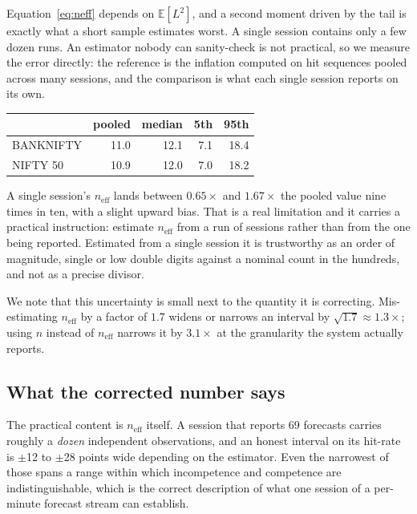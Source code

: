 \documentclass[conference]{IEEEtran}
\begin{document}
Equation~\eqref{eq:neff} depends on $\mathbb{E}[L^2]$, and a second moment
driven by the tail is exactly what a short sample estimates worst. A single
session contains only a few dozen runs. An estimator nobody can sanity-check is
not practical, so we measure the error directly: the reference is the inflation
computed on hit sequences pooled across many sessions, and the comparison is
what each single session reports on its own.

\begin{center}
\footnotesize
\begin{tabular}{@{}lrrrr@{}}
\toprule
& \textbf{pooled} & \textbf{median} & \textbf{5th} & \textbf{95th} \\
\midrule
BANKNIFTY & 11.0 & 12.1 & 7.1 & 18.4 \\
NIFTY 50 & 10.9 & 12.0 & 7.0 & 18.2 \\
\bottomrule
\end{tabular}
\end{center}

A single session's $n_{\text{eff}}$ lands between $0.65\times$ and $1.67\times$
the pooled value nine times in ten, with a slight upward bias. That is a real
limitation and it carries a practical instruction: estimate $n_{\text{eff}}$
from a run of sessions rather than from the one being reported. Estimated from a
single session it is trustworthy as an order of magnitude, single or low double
digits against a nominal count in the hundreds, and not as a precise divisor.

We note that this uncertainty is small next to the quantity it is correcting.
Mis-estimating $n_{\text{eff}}$ by a factor of $1.7$ widens or narrows an
interval by $\sqrt{1.7} \approx 1.3\times$; using $n$ instead of
$n_{\text{eff}}$ narrows it by $3.1\times$ at the granularity the system
actually reports.

\subsection{What the corrected number says}

The practical content is $n_{\text{eff}}$ itself. A session that reports 69
forecasts carries roughly a \emph{dozen} independent observations, and an honest
interval on its hit-rate is $\pm$12 to $\pm$28 points wide depending on the
estimator. Even the narrowest of those spans a range within which incompetence
and competence are indistinguishable, which is the correct description of what
one session of a per-minute forecast stream can establish.
\end{document}
